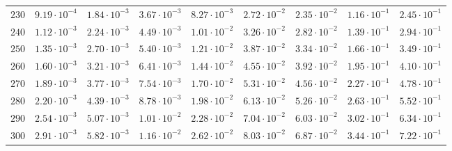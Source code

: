 \begin{landscape}
\begin{table}
\begin{tabular}{lcccccccc}
$	230	$ & $	9.19 \cdot 10^{-4} 	$ & $	1.84 \cdot 10^{-3} 	$ & $	3.67 \cdot 10^{-3} 	$ & $	8.27 \cdot 10^{-3} 	$ & $	2.72 \cdot 10^{-2} 	$ & $	2.35 \cdot 10^{-2} 	$ & $	1.16 \cdot 10^{-1} 	$ & $	2.45 \cdot 10^{-1} 	 $ \\
$	240	$ & $	1.12 \cdot 10^{-3} 	$ & $	2.24 \cdot 10^{-3} 	$ & $	4.49 \cdot 10^{-3} 	$ & $	1.01 \cdot 10^{-2} 	$ & $	3.26 \cdot 10^{-2} 	$ & $	2.82 \cdot 10^{-2} 	$ & $	1.39 \cdot 10^{-1} 	$ & $	2.94 \cdot 10^{-1} 	 $ \\
$	250	$ & $	1.35 \cdot 10^{-3} 	$ & $	2.70 \cdot 10^{-3} 	$ & $	5.40 \cdot 10^{-3} 	$ & $	1.21 \cdot 10^{-2} 	$ & $	3.87 \cdot 10^{-2} 	$ & $	3.34 \cdot 10^{-2} 	$ & $	1.66 \cdot 10^{-1} 	$ & $	3.49 \cdot 10^{-1} 	 $ \\
$	260	$ & $	1.60 \cdot 10^{-3} 	$ & $	3.21 \cdot 10^{-3} 	$ & $	6.41 \cdot 10^{-3} 	$ & $	1.44 \cdot 10^{-2} 	$ & $	4.55 \cdot 10^{-2} 	$ & $	3.92 \cdot 10^{-2} 	$ & $	1.95 \cdot 10^{-1} 	$ & $	4.10 \cdot 10^{-1} 	 $ \\
$	270	$ & $	1.89 \cdot 10^{-3} 	$ & $	3.77 \cdot 10^{-3} 	$ & $	7.54 \cdot 10^{-3} 	$ & $	1.70 \cdot 10^{-2} 	$ & $	5.31 \cdot 10^{-2} 	$ & $	4.56 \cdot 10^{-2} 	$ & $	2.27 \cdot 10^{-1} 	$ & $	4.78 \cdot 10^{-1} 	 $ \\
$	280	$ & $	2.20 \cdot 10^{-3} 	$ & $	4.39 \cdot 10^{-3} 	$ & $	8.78 \cdot 10^{-3} 	$ & $	1.98 \cdot 10^{-2} 	$ & $	6.13 \cdot 10^{-2} 	$ & $	5.26 \cdot 10^{-2} 	$ & $	2.63 \cdot 10^{-1} 	$ & $	5.52 \cdot 10^{-1} 	 $ \\
$	290	$ & $	2.54 \cdot 10^{-3} 	$ & $	5.07 \cdot 10^{-3} 	$ & $	1.01 \cdot 10^{-2} 	$ & $	2.28 \cdot 10^{-2} 	$ & $	7.04 \cdot 10^{-2} 	$ & $	6.03 \cdot 10^{-2} 	$ & $	3.02 \cdot 10^{-1} 	$ & $	6.34 \cdot 10^{-1} 	 $ \\
$	300	$ & $	2.91 \cdot 10^{-3} 	$ & $	5.82 \cdot 10^{-3} 	$ & $	1.16 \cdot 10^{-2} 	$ & $	2.62 \cdot 10^{-2} 	$ & $	8.03 \cdot 10^{-2} 	$ & $	6.87 \cdot 10^{-2} 	$ & $	3.44 \cdot 10^{-1} 	$ & $	7.22 \cdot 10^{-1} 	 $ \\
        \hline
      \end{tabular}
  \end{table}
\end{landscape}


